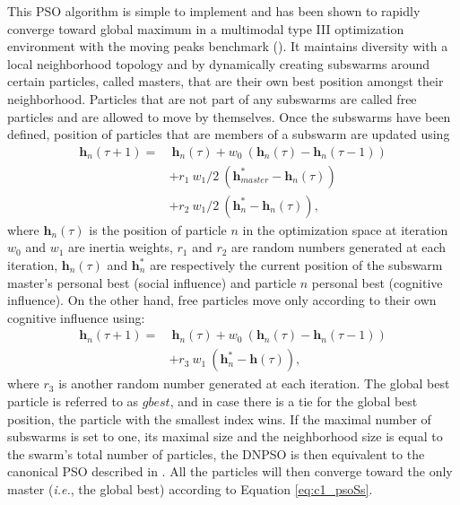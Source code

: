 This PSO algorithm is simple to implement and has been shown to rapidly converge toward global maximum in a multimodal type III optimization environment with the moving peaks benchmark (\cite{nickabadi08_2}). It maintains diversity with a local neighborhood topology and by dynamically creating subswarms around certain particles, called masters, that are their own best position amongst their neighborhood. Particles that are not part of any subswarms are called free particles and are allowed to move by themselves. Once the subswarms have been defined, position of particles that are members of a subswarm are updated using
\begin{equation}
	\begin{split}
		\textbf{h}_n(\tau+1) = & \ \textbf{h}_n(\tau) 
                    + w_0\ ( \textbf{h}_n(\tau) - \textbf{h}_n(\tau-1) )\\
	  							& + r_1\ w_1/2\ 
                      ( \textbf{h}^*_{\textit{master}} - \textbf{h}_n(\tau) )\\
     							& + r_2\ w_1/2\ 
                      ( \textbf{h}^*_n -                 \textbf{h}_n(\tau) ),  	
	\end{split}
	\label{eq:c1_psoSs}
\end{equation}
where $\textbf{h}_n(\tau)$ is the position of particle $n$ in the optimization space at iteration $w_0$ and $w_1$ are inertia weights, $r_1$ and $r_2$ are random numbers generated at each iteration, $\textbf{h}_n(\tau)$ and $\textbf{h}^*_n$ are respectively the current position of the subswarm master's personal best (social influence) and particle $n$ personal best (cognitive influence). On the other hand, free particles move only according to their own cognitive influence using:
\begin{equation}
	\begin{split}
		\textbf{h}_n\left(\tau+1\right) = & \ \textbf{h}_n(\tau) 
                      + w_0\ ( \textbf{h}_n(\tau) - \textbf{h}_n(\tau-1) )\\
										& + r_3\ w_1\ ( \textbf{h}^*_n - \textbf{h}(\tau) ), 
  \end{split}
	\label{eq:c1_psoF}
\end{equation}
where $r_3$ is another random number generated at each iteration. The global best particle is referred to as $gbest$, and in case there is a tie for the global best position, the particle with the smallest index wins. If the maximal number of subswarms is set to one, its maximal size and the neighborhood size is equal to the swarm's total number of particles, the DNPSO is then equivalent to the canonical PSO described in \cite{kennedy95}. All the particles will then converge toward the only master (\emph{i.e.}, the global best) according to Equation \ref{eq:c1_psoSs}.

